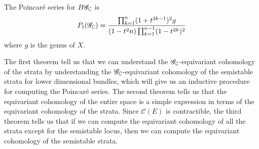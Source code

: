 %
\begin{thm}
The Poincar\'e series for $B\mathscr{G}_{\mathbb{C}}$ is
\[
P_t(\mathscr{G}_{\mathbb{C}}) = \frac{\prod^n_{k=1}(1+t^{2k-1})^2g}
{(1-t^2n)\prod_{k=1}^{n-1}(1-t^{2k})^2}
\]
where $g$ is the genus of $X$.
\end{thm}
%
The first theorem tell us that we can understand the $\mathscr{G}_{\mathbb{C}}$-equivariant
cohomology of the strata by understanding the $\mathscr{G}_{\mathbb{C}}$-equivariant
cohomology of the semistable strata for lower dimensional bundles,
which will give us an inductive procedure for computing the Poincar\'e series.
The second theorem tells us that the equivariant cohomology of
the entire space is a simple expression in terms of the equivariant cohomology
of the strata. Since $\mathscr{C}(E)$ is contractible, the third
theorem tells us that if we can compute the equivariant cohomology of
all the strata except for the semistable locus, then we can compute the
equivariant cohomology of the semistable strata. \\

